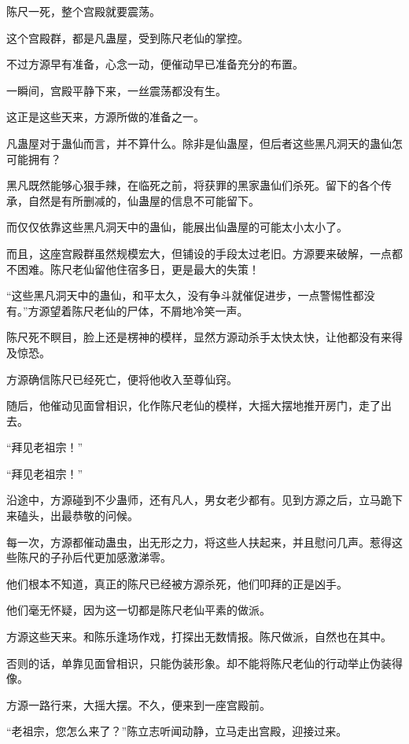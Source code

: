
\begin{this_body}

陈尺一死，整个宫殿就要震荡。

这个宫殿群，都是凡蛊屋，受到陈尺老仙的掌控。

不过方源早有准备，心念一动，便催动早已准备充分的布置。

一瞬间，宫殿平静下来，一丝震荡都没有生。

这正是这些天来，方源所做的准备之一。

凡蛊屋对于蛊仙而言，并不算什么。除非是仙蛊屋，但后者这些黑凡洞天的蛊仙怎可能拥有？

黑凡既然能够心狠手辣，在临死之前，将获罪的黑家蛊仙们杀死。留下的各个传承，自然是有所删减的，仙蛊屋的信息不可能留下。

而仅仅依靠这些黑凡洞天中的蛊仙，能展出仙蛊屋的可能太小太小了。

而且，这座宫殿群虽然规模宏大，但铺设的手段太过老旧。方源要来破解，一点都不困难。陈尺老仙留他住宿多日，更是最大的失策！

“这些黑凡洞天中的蛊仙，和平太久，没有争斗就催促进步，一点警惕性都没有。”方源望着陈尺老仙的尸体，不屑地冷笑一声。

陈尺死不瞑目，脸上还是楞神的模样，显然方源动杀手太快太快，让他都没有来得及惊恐。

方源确信陈尺已经死亡，便将他收入至尊仙窍。

随后，他催动见面曾相识，化作陈尺老仙的模样，大摇大摆地推开房门，走了出去。

“拜见老祖宗！”

“拜见老祖宗！”

沿途中，方源碰到不少蛊师，还有凡人，男女老少都有。见到方源之后，立马跪下来磕头，出最恭敬的问候。

每一次，方源都催动蛊虫，出无形之力，将这些人扶起来，并且慰问几声。惹得这些陈尺的子孙后代更加感激涕零。

他们根本不知道，真正的陈尺已经被方源杀死，他们叩拜的正是凶手。

他们毫无怀疑，因为这一切都是陈尺老仙平素的做派。

方源这些天来。和陈乐逢场作戏，打探出无数情报。陈尺做派，自然也在其中。

否则的话，单靠见面曾相识，只能伪装形象。却不能将陈尺老仙的行动举止伪装得像。

方源一路行来，大摇大摆。不久，便来到一座宫殿前。

“老祖宗，您怎么来了？”陈立志听闻动静，立马走出宫殿，迎接过来。


\end{this_body}
